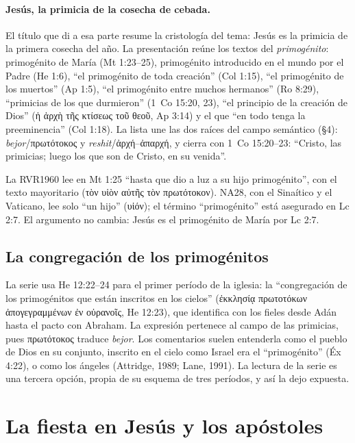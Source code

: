 \documentclass[11pt,letterpaper]{article}
\newcommand{\grc}[1]{\foreignlanguage{ancientgreek}{#1}}
\begin{document}
\paragraph{Jesús, la primicia de la cosecha de cebada.} El título que di a esa parte resume la cristología del tema: Jesús es la primicia de la primera cosecha del año. La presentación reúne los textos del \emph{primogénito}: primogénito de María (Mt 1:23--25), primogénito introducido en el mundo por el Padre (He 1:6), ``el primogénito de toda creación'' (Col 1:15), ``el primogénito de los muertos'' (Ap 1:5), ``el primogénito entre muchos hermanos'' (Ro 8:29), ``primicias de los que durmieron'' (1~Co 15:20, 23), ``el principio de la creación de Dios'' (\grc{ἡ ἀρχὴ τῆς κτίσεως τοῦ θεοῦ}, Ap 3:14) y el que ``en todo tenga la preeminencia'' (Col 1:18). La lista une las dos raíces del campo semántico (§4): \emph{bejor}/\grc{πρωτότοκος} y \emph{reshit}/\grc{ἀρχή}--\grc{ἀπαρχή}, y cierra con 1~Co 15:20--23: ``Cristo, las primicias; luego los que son de Cristo, en su venida''.

\begin{nota}
La RVR1960 lee en Mt 1:25 ``hasta que dio a luz a su hijo primogénito'', con el texto mayoritario (\grc{τὸν υἱὸν αὐτῆς τὸν πρωτότοκον}). NA28, con el Sinaítico y el Vaticano, lee solo ``un hijo'' (\grc{υἱόν}); el término ``primogénito'' está asegurado en Lc 2:7. El argumento no cambia: Jesús es el primogénito de María por Lc 2:7.
\end{nota}

\subsection{La congregación de los primogénitos}
La serie usa He 12:22--24 para el primer período de la iglesia: la ``congregación de los primogénitos que están inscritos en los cielos'' (\grc{ἐκκλησίᾳ πρωτοτόκων ἀπογεγραμμένων ἐν οὐρανοῖς}, He 12:23), que identifica con los fieles desde Adán hasta el pacto con Abraham. La expresión pertenece al campo de las primicias, pues \grc{πρωτότοκος} traduce \emph{bejor}. Los comentarios suelen entenderla como el pueblo de Dios en su conjunto, inscrito en el cielo como Israel era el ``primogénito'' (Éx 4:22), o como los ángeles (Attridge, 1989; Lane, 1991). La lectura de la serie es una tercera opción, propia de su esquema de tres períodos, y así la dejo expuesta.

\section{La fiesta en Jesús y los apóstoles}
\end{document}
